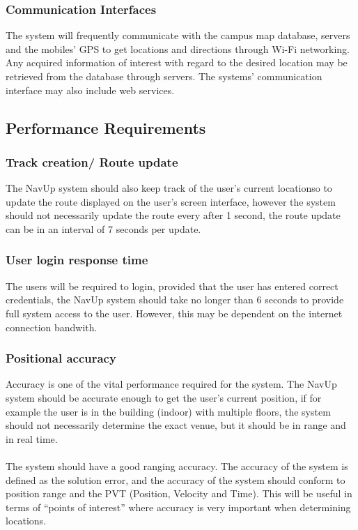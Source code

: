 \subsubsection{Communication Interfaces}
The system will frequently communicate with the campus map database, servers and the mobiles’ GPS to get locations and directions through Wi-Fi networking. Any acquired information of interest with regard to the desired location may be retrieved from the database through servers. The systems’ communication interface may also include web services.
		
\subsection{Performance Requirements}
\subsubsection{Track creation/ Route update}
The NavUp system should also keep track of the user's current locationso to update the route displayed on the user's screen interface, however the system should not necessarily update the route every after 1 second, the route update can be in an interval of 7 seconds per update.

\subsubsection{User login response time}
The users will be required to login, provided that the user has entered correct credentials, the NavUp system should take no longer
than 6 seconds to provide full system access to the user. However, this may be dependent on the internet connection bandwith.
	
\subsubsection{Positional accuracy}
Accuracy is one of the vital performance required for the system. The NavUp system should be accurate enough to get the user’s current position, if for example the user is in the building (indoor) with multiple floors, the system should not necessarily determine the exact venue, but it should be in range and	in real time.\\\\ 
The system should have a good ranging accuracy. The accuracy of the system is defined as the solution error, and the accuracy of the system should conform to position range and the PVT (Position, Velocity and Time). This will be useful in terms of “points of interest” where accuracy is very important when determining locations.

